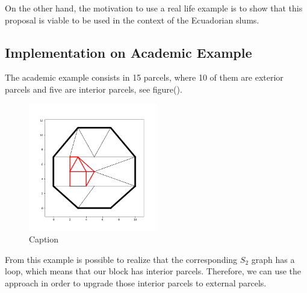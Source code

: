 \documentclass[10pt]{article}
\begin{document}
On the other hand, the motivation to use a real life example is to show that this proposal is viable to be used in the context of the Ecuadorian slums.

\subsection{Implementation on Academic Example}
The academic example consists in 15 parcels, where 10 of them are exterior parcels and five are interior parcels, see figure().\\

\begin{figure}[H]
    \centering
    \includegraphics[width=0.50\textwidth]{images/Figure_1.png}
    \caption{Caption}
    \label{fig:my_label}
\end{figure}

From this example is possible to realize that the corresponding $S_2$ graph has a loop, which means that our block has interior parcels. Therefore, we can use the approach in order to upgrade those interior parcels to external parcels.\\
\end{document}
